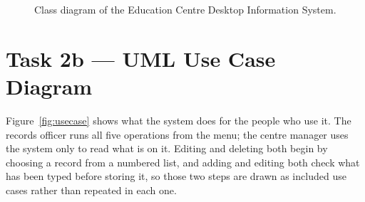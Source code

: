 \documentclass[11pt,a4paper]{article}
\begin{document}
\begin{figure}[H]
{}
\caption{Class diagram of the Education Centre Desktop Information System.}
\label{fig:class}
\end{figure}

\clearpage
\section*{Task 2b --- UML Use Case Diagram}

Figure~\ref{fig:usecase} shows what the system does for the people who use it.
The records officer runs all five operations from the menu; the centre manager
uses the system only to read what is on it. Editing and deleting both begin by
choosing a record from a numbered list, and adding and editing both check what
has been typed before storing it, so those two steps are drawn as included use
cases rather than repeated in each one.
\end{document}
